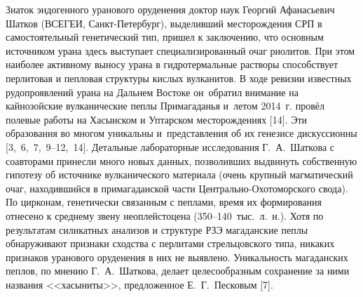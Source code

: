 Знаток эндогенного уранового оруденения доктор наук Георгий Афанасьевич Шатков (ВСЕГЕИ, Санкт-Петербург), выделивший месторождения СРП в самостоятельный генетический тип, пришел к заключению, что основным источником урана здесь выступает специализированный очаг риолитов. При этом наиболее активному выносу урана в гидротермальные растворы способствует перлитовая и пепловая структуры кислых вулканитов. В ходе ревизии известных рудопроявлений урана на Дальнем Востоке он~обратил внимание на кайнозойские вулканические пеплы Примагаданья и~летом 2014~г. провёл полевые работы на Хасынском и Уптарском месторождениях [14]. Эти образования во многом уникальны и~представления об их генезисе дискуссионны [3, 6, 7, 9--12, 14]. Детальные лабораторные исследования Г.~А.~Шаткова с соавторами принесли много новых данных, позволивших выдвинуть собственную гипотезу об источнике вулканического материала (очень крупный магматический очаг, находившийся в примагаданской части Центрально-Охотоморского свода). По цирконам, генетически связанным с пеплами, время их формирования отнесено к среднему звену неоплейстоцена (350--140~тыс.~л.~н.). Хотя по результатам силикатных анализов и структуре РЗЭ магаданские пеплы обнаруживают признаки сходства с перлитами стрельцовского типа, никаких признаков уранового оруденения в них не выявлено. Уникальность магаданских пеплов, по мнению Г.~А.~Шаткова, делает целесообразным сохранение за ними названия <<хасыниты>>, предложенное Е.~Г.~Песковым [7].


